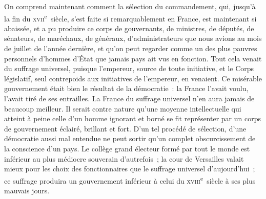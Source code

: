 \documentclass[french,twoside]{book} %
\begin{document}
On comprend maintenant comment la sélection du commandement, qui, jusqu’à la fin du \textsc{xvii}\textsuperscript{e} siècle, s’est faite si remarquablement en France, est maintenant si abaissée, et a pu produire ce corps de gouvernants, de ministres, de députés, de sénateurs, de maréchaux, de généraux, d’administrateurs que nous avions au mois de juillet de l’année dernière, et qu’on peut regarder comme un des plus pauvres personnels d’hommes d’État que jamais pays ait vus en fonction. Tout cela venait du suffrage universel, puisque l’empereur, source de toute initiative, et le Corps législatif, seul contrepoids aux initiatives de l’empereur, en venaient. Ce misérable gouvernement était bien le résultat de la démocratie : la France l’avait voulu, l’avait tiré de ses entrailles. La France du suffrage universel n’en aura jamais de beaucoup meilleur. Il serait contre nature qu’une moyenne intellectuelle qui atteint à peine celle d’un homme ignorant et borné se fit représenter par un corps de gouvernement éclairé, brillant et fort. D’un tel procédé de sélection, d’une démocratie aussi mal entendue ne peut sortir qu’un complet obscurcissement de la conscience d’un pays. Le collège grand électeur formé par tout le monde est inférieur au plus médiocre souverain d’autrefois ; la cour de Versailles valait mieux pour les choix des fonctionnaires que le suffrage universel d’aujourd’hui ; ce suffrage produira un gouvernement inférieur à celui du \textsc{xviii}\textsuperscript{e} siècle à ses plus mauvais jours.\par
\end{document}
